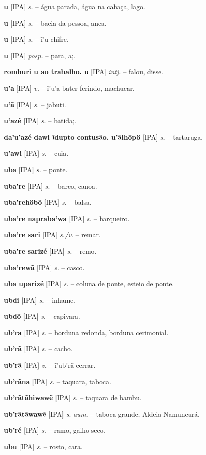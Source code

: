 \textbf{u} [IPA] \textit{s.} -- água parada, água na cabaça, lago.

\textbf{u} [IPA] \textit{s.} -- bacia da pessoa, anca.

\textbf{u} [IPA] \textit{s.} -- ĩ'u chifre.

\textbf{u} [IPA] \textit{posp.} -- para, a;.

\textbf{romhuri u ao trabalho. u} [IPA] \textit{intj.} -- falou, disse.

\textbf{u'a} [IPA] \textit{v.} -- ĩ'u'a bater ferindo, machucar.

\textbf{u'ã} [IPA] \textit{s.} -- jabuti.

\textbf{u'azé} [IPA] \textit{s.} -- batida;.

\textbf{da'u'azé dawi ĩdupto contusão. u'ãihöpö} [IPA] \textit{s.} -- tartaruga.

\textbf{u'awi} [IPA] \textit{s.} -- cuia.

\textbf{uba} [IPA] \textit{s.} -- ponte.

\textbf{uba're} [IPA] \textit{s.} -- barco, canoa.

\textbf{uba'rehöbö} [IPA] \textit{s.} -- balsa.

\textbf{uba're napraba'wa} [IPA] \textit{s.} -- barqueiro.

\textbf{uba're sari} [IPA] \textit{s./v.} -- remar.

\textbf{uba're sarizé} [IPA] \textit{s.} -- remo.

\textbf{uba'rewã} [IPA] \textit{s.} -- casco.

\textbf{uba uparizé} [IPA] \textit{s.} -- coluna de ponte, esteio de ponte.

\textbf{ubdi} [IPA] \textit{s.} -- inhame.

\textbf{ubdö} [IPA] \textit{s.} -- capivara.

\textbf{ub'ra} [IPA] \textit{s.} -- borduna redonda, borduna cerimonial.

\textbf{ub'rã} [IPA] \textit{s.} -- cacho.

\textbf{ub'rã} [IPA] \textit{v.} -- ĩ'ub'rã cerrar.

\textbf{ub'rãna} [IPA] \textit{s.} -- taquara, taboca.

\textbf{ub'rãtãhiwawẽ} [IPA] \textit{s.} -- taquara de bambu.

\textbf{ub'rãtãwawẽ} [IPA] \textit{s. aum.} -- taboca grande; Aldeia Namuncurá.

\textbf{ub'ré} [IPA] \textit{s.} -- ramo, galho seco.

\textbf{ubu} [IPA] \textit{s.} -- rosto, cara.

